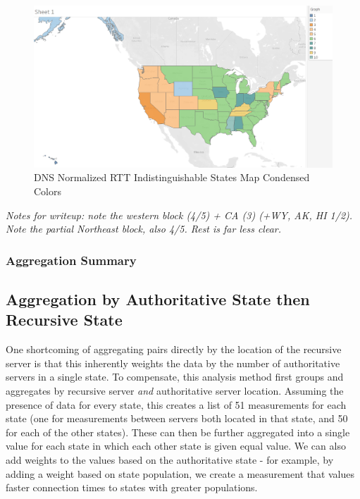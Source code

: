 \begin{figure}[H]
    \centering
    \includegraphics[width=\textwidth]{images/dns/kruskals_analysis_no_auth_agg/rtt_normalized/distinct_map2.png}
    \caption{DNS Normalized RTT Indistinguishable States Map Condensed Colors}
    \label{fig:dns_normalized_rtt_indistinguishable_states_map_consdensed_colors}
\end{figure}

\textit{Notes for writeup: note the western block (4/5) + CA (3) (+WY, AK, HI 1/2). Note the partial Northeast block, also 4/5. Rest is \textit{far less clear}.}



\subsubsection{Aggregation Summary}







\subsection{Aggregation by Authoritative State then Recursive State}

One shortcoming of aggregating pairs directly by the location of the recursive server is that this inherently weights the data by the number of authoritative servers in a single state. To compensate, this analysis method first groups and aggregates by recursive server \textit{and} authoritative server location. Assuming the presence of data for every state, this creates a list of 51 measurements for each state (one for measurements between servers both located in that state, and 50 for each of the other states). These can then be further aggregated into a single value for each state in which each other state is given equal value. We can also add weights to the values based on the authoritative state - for example, by adding a weight based on state population, we create a measurement that values faster connection times to states with greater populations.

